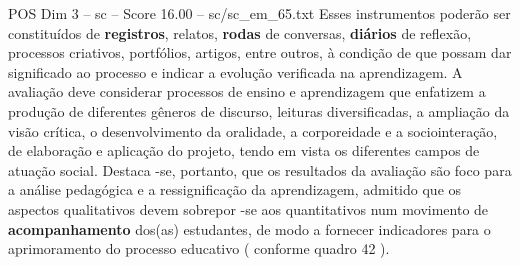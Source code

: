 \begin{textsample}{POS Dim 3 – sc – Score 16.00 – sc/sc\_em\_65.txt}
Esses instrumentos poderão ser constituídos de \textbf{registros}, relatos, \textbf{rodas} de conversas, \textbf{diários} de reflexão, processos criativos, portfólios, artigos, entre outros, à condição de que possam dar significado ao processo e indicar a evolução verificada na aprendizagem.
A avaliação deve considerar processos de ensino e aprendizagem que enfatizem a produção de diferentes gêneros de discurso, leituras diversificadas, a ampliação da visão crítica, o desenvolvimento da oralidade, a corporeidade e a sociointeração, de elaboração e aplicação do projeto, tendo em vista os diferentes campos de atuação social.
Destaca -se, portanto, que os resultados da avaliação são foco para a análise pedagógica e a ressignificação da aprendizagem, admitido que os aspectos qualitativos devem sobrepor -se aos quantitativos num movimento de \textbf{acompanhamento} dos(as) estudantes, de modo a fornecer indicadores para o aprimoramento do processo educativo ( conforme quadro 42 ).

\end{textsample}
